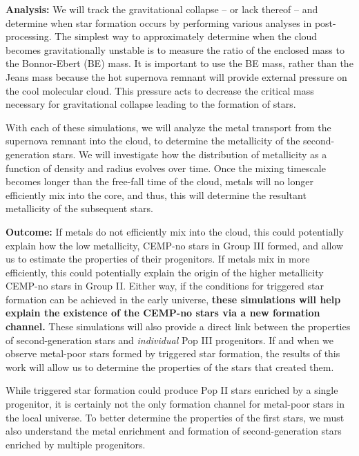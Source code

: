 \documentclass[letterpaper, 12pt]{article}
\begin{document}
\textbf{Analysis:} We will track the gravitational collapse -- or lack thereof -- and determine when star formation occurs by performing various analyses in post-processing. The simplest way to approximately determine when the cloud becomes gravitationally unstable is to measure the ratio of the enclosed mass to the Bonnor-Ebert (BE) mass. It is important to use the BE mass, rather than the Jeans mass because the hot supernova remnant will provide external pressure on the cool molecular cloud. This pressure acts to decrease the critical mass necessary for gravitational collapse leading to the formation of stars.

With each of these simulations, we will analyze the metal transport from the supernova remnant into the cloud, to determine the metallicity of the second-generation stars. We will investigate how the distribution of metallicity as a function of density and radius evolves over time. Once the mixing timescale becomes longer than the free-fall time of the cloud, metals will no longer efficiently mix into the core, and thus, this will determine the resultant metallicity of the subsequent stars. 

\textbf{Outcome:} If metals do not efficiently mix into the cloud, this could potentially explain how the low metallicity, CEMP-no stars in Group III formed, and allow us to estimate the properties of their progenitors. If metals mix in more efficiently, this could potentially explain the origin of the higher metallicity CEMP-no stars in Group II. Either way, if the conditions for triggered star formation can be achieved in the early universe, \textbf{these simulations will help explain the existence of the CEMP-no stars via a new formation channel.} These simulations will also provide a direct link between the properties of second-generation stars and \textit{individual} Pop III progenitors. If and when we observe metal-poor stars formed by triggered star formation, the results of this work will allow us to determine the properties of the stars that created them.


While triggered star formation could produce Pop II stars enriched by a single progenitor, it is certainly not the only formation channel for metal-poor stars in the local universe. To better determine the properties of the first stars, we must also understand the metal enrichment and formation of second-generation stars enriched by multiple progenitors.
\end{document}
